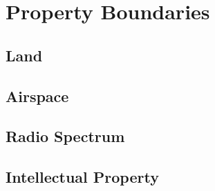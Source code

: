 \chapter{Property Boundaries}




\section{Land}



\begin{questions}

\end{questions}

\section{Airspace}



\begin{questions}

\end{questions}

\section{Radio Spectrum}



\begin{questions}

\end{questions}

\section{Intellectual Property}





